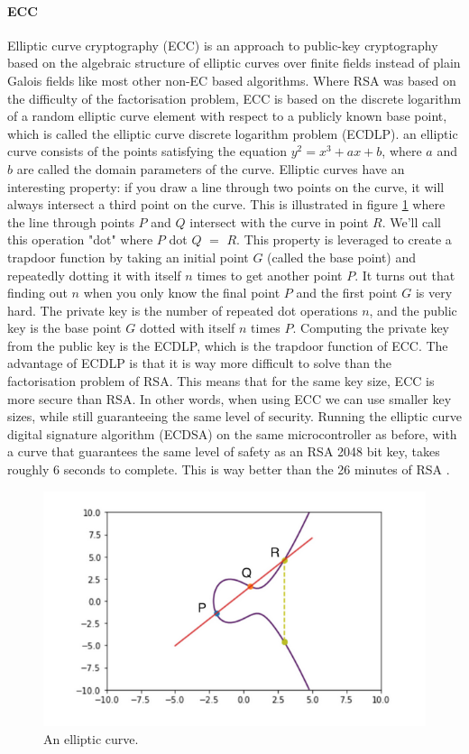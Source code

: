 \documentclass[11pt]{article}
\begin{document}
\paragraph{ECC} Elliptic curve cryptography (ECC) is an approach to public-key cryptography based on the algebraic structure of elliptic curves over finite fields instead of plain Galois fields like most other non-EC based algorithms. Where RSA was based on the difficulty of the factorisation problem, ECC  is based on the discrete logarithm of a random elliptic curve element with respect to a publicly known base point, which is called the elliptic curve discrete logarithm problem (ECDLP)\cite{ECCwiki}. an elliptic curve consists of the points satisfying the equation $ y^2 = x^3 + ax + b$, where $a$ and $b$ are called the domain parameters of the curve. Elliptic curves have an interesting property: if you draw a line through two points on the curve, it will always intersect a third point on the curve. This is illustrated in figure \ref{fig:ECC} where the line through points $P$ and $Q$ intersect with the curve in point $R$. We'll call this operation "dot" where $P$ dot $Q$ $=$ $R$. This property is leveraged to create a trapdoor function by taking an initial point $G$ (called the base point) and repeatedly dotting it with itself $n$ times to get another point $P$. It turns out that finding out $n$ when you only know the final point $P$ and the first point $G$ is very hard. The private key is the number of repeated dot operations $n$, and the public key is the base point $G$ dotted with itself $n$ times $P$. Computing the private key from the public key is the ECDLP, which is the trapdoor function of ECC. The advantage of ECDLP is that it is way more difficult to solve than the factorisation problem of RSA. This means that for the same key size, ECC is more secure than RSA. In other words, when using ECC we can use smaller key sizes, while still guaranteeing the same level of security.  Running the elliptic curve digital signature algorithm (ECDSA) on the same microcontroller as before, with a curve that guarantees the same level of safety as an RSA 2048 bit key, takes roughly 6 seconds to complete. This is way better than the 26 minutes of RSA \cite{Sethi}.

\begin{figure}[h]
	\label{fig:ECC}
	\centering
	\includegraphics[width=\textwidth]{ECC.png}
	\caption{An elliptic curve. \cite{ECCbasics}}
\end{figure} 
\end{document}
